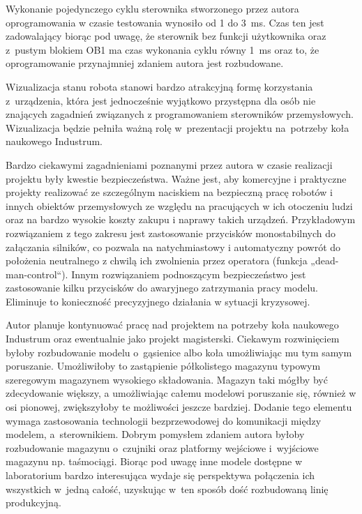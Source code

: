 Wykonanie pojedynczego cyklu sterownika stworzonego przez autora oprogramowania w czasie testowania wynosiło od 1 do 3~ms. Czas ten jest zadowalający biorąc pod uwagę, że sterownik bez funkcji użytkownika oraz z~pustym blokiem OB1 ma czas wykonania cyklu równy 1~ms oraz to, że oprogramowanie przynajmniej zdaniem autora jest rozbudowane.

Wizualizacja stanu robota stanowi bardzo atrakcyjną formę korzystania z~urządzenia, która jest jednocześnie wyjątkowo przystępna dla osób nie znających zagadnień związanych z programowaniem sterowników przemysłowych. Wizualizacja będzie pełniła ważną rolę w~prezentacji projektu na~potrzeby koła naukowego Industrum.

Bardzo ciekawymi zagadnieniami poznanymi przez autora w czasie realizacji projektu były kwestie bezpieczeństwa. Ważne jest, aby komercyjne i praktyczne projekty realizować ze szczególnym naciskiem na bezpieczną pracę robotów i innych obiektów przemysłowych ze względu na pracujących w ich otoczeniu ludzi oraz na bardzo wysokie koszty zakupu i naprawy takich urządzeń. Przykładowym rozwiązaniem z tego zakresu jest zastosowanie przycisków monostabilnych do załączania silników, co pozwala na natychmiastowy i automatyczny powrót do położenia neutralnego z chwilą ich zwolnienia przez operatora (funkcja „dead-man-control“). Innym rozwiązaniem podnoszącym bezpieczeństwo jest zastosowanie kilku przycisków do awaryjnego zatrzymania pracy modelu. Eliminuje to konieczność precyzyjnego działania w sytuacji kryzysowej.

Autor planuje kontynuować pracę nad projektem na potrzeby koła naukowego Industrum oraz ewentualnie jako projekt magisterski. Ciekawym rozwinięciem byłoby rozbudowanie modelu o~gąsienice albo koła umożliwiając mu tym samym poruszanie. Umożliwiłoby to zastąpienie półkolistego magazynu typowym szeregowym magazynem wysokiego składowania. Magazyn taki mógłby być zdecydowanie większy, a umożliwiając całemu modelowi poruszanie się, również w osi pionowej, zwiększyłoby te możliwości jeszcze bardziej. Dodanie tego elementu wymaga zastosowania technologii bezprzewodowej do komunikacji między modelem, a~sterownikiem. Dobrym pomysłem zdaniem autora byłoby rozbudowanie magazynu o~czujniki oraz platformy wejściowe i~wyjściowe magazynu np. taśmociągi. Biorąc pod uwagę inne modele dostępne w laboratorium bardzo interesująca wydaje się perspektywa połączenia ich wszystkich w~jedną całość, uzyskując w~ten sposób dość rozbudowaną linię produkcyjną.
